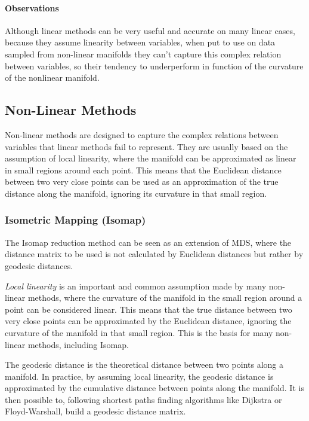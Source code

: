             
            \paragraph{Observations}
            Although linear methods can be very useful and accurate on many linear cases, because they assume linearity between variables, when put to use on data sampled from non-linear manifolds they can't capture this complex relation between variables, so their tendency to underperform in function of the curvature of the nonlinear manifold.

    \subsection{Non-Linear Methods}
        Non-linear methods are designed to capture the complex relations between variables that linear methods fail to represent. They are usually based on the assumption of local linearity, where the manifold can be approximated as linear in small regions around each point. This means that the Euclidean distance between two very close points can be used as an approximation of the true distance along the manifold, ignoring its curvature in that small region.

        \subsubsection{Isometric Mapping (Isomap)} 
            The \ac{Isomap} \cite{isomap} reduction method can be seen as an extension of MDS, where the distance matrix to be used is not calculated by Euclidean distances but rather by geodesic distances.

            \textit{Local linearity} is an important and common assumption made by many non-linear methods, where the curvature of the manifold in the small region around a point can be considered linear. This means that the true distance between two very close points can be approximated by the Euclidean distance, ignoring the curvature of the manifold in that small region. This is the basis for many non-linear methods, including \ac{Isomap}.

            The geodesic distance is the theoretical distance between two points along a manifold. In practice, by assuming local linearity, the geodesic distance is approximated by the cumulative distance between points along the manifold. It is then possible to, following shortest paths finding algorithms like Dijkstra or Floyd-Warshall, build a geodesic distance matrix.
            
